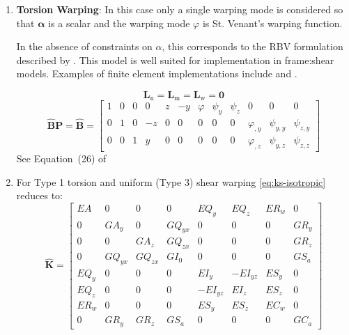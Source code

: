 \begin{enumerate}
\item \textbf{Torsion Warping}: In this case only a single warping mode is considered so that \(\bm{\alpha}\) is a scalar and the warping mode \(\varphi\) is St. Venant's warping function.

In the absence of constraints on \(\alpha\), this corresponds to the RBV formulation described by \cite{armero2021modeling}.
This model is well suited for implementation in \gls{frame:shear} models. Examples of finite element implementations include \cite{simo1991geometricallyexact} and \cite{gruttmann2000theory}.

$$
  \mathbf{L}_{\mathrm{n}}
= \mathbf{L}_{\mathrm{m}}
= \mathbf{L}_{\mathrm{w}}
= \bm{0}
$$
$$
\hat{\bm{B}}\mathbf{P} = \hat{\bm{B}} = \left[\begin{array}{ccc|ccc|ccc|ccc}
1 & 0 & 0 & 0 & z & - y & \varphi & \psi_{y} & \psi_{z} & 0 & 0 & 0 \\
0 & 1 & 0 & - z & 0 & 0 & 0 & 0 & 0 & \varphi_{,y} & \psi_{y,y} & \psi_{z,y}\\
0 & 0 & 1 & y & 0 & 0 & 0 & 0 & 0 & \varphi_{,z} & \psi_{y,z} & \psi_{z,z}
\end{array}\right]
$$
See Equation~(26) of \cite{dire2019mixed}

\item For Type 1 torsion and uniform (Type 3) shear warping \cref{eq:ks-isotropic} reduces to:
\begin{equation*}
\hat{\mathbf{K}} = \left[\begin{array}{ccc|ccc|cc}
E A & 0 & 0 & 0 & E Q_{y} & E Q_{z} & E R_{w} & 0\\
0 & G A_{y} & 0 & G Q_{yx} & 0 & 0 & 0 & G R_{y}\\
0 & 0 & G A_{z} & G Q_{zx} & 0 & 0 & 0 & G R_{z}\\ \hline
0 & G Q_{yx} & G Q_{zx} & G I_{0} & 0 & 0 & 0 & G S_{a} \\
E Q_{y} & 0 & 0 & 0 & E I_{y} & - E I_{yz} & E S_{y} & 0 \\
E Q_{z} & 0 & 0 & 0 & - E I_{yz} & E I_{z} & E S_{z} & 0 \\ \hline
E R_{w} & 0 & 0 & 0 & E S_{y} & E S_{z} & E C_{w} & 0 \\
0 & G R_{y} & G R_{z} & G S_{a} & 0 & 0 & 0 & G C_{a}
\end{array}\right]
\end{equation*}


\end{enumerate}

